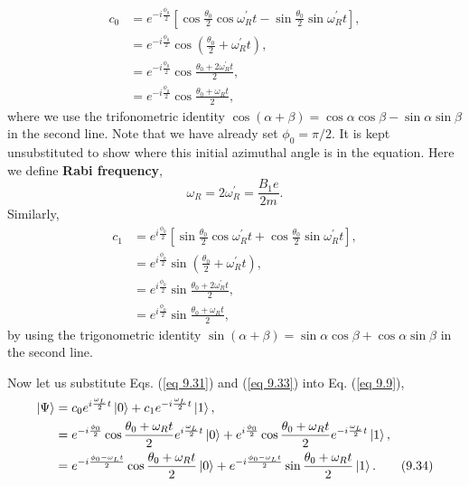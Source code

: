 \documentclass{article}
\begin{document}
\begin{align*}\label{eq 9.31}
    c_0&=e^{-i\frac{\phi_0}{2}}[\cos{\frac{\theta_0}{2}}\cos\omega_R^\prime t - \sin{\frac{\theta_0}{2}}\sin\omega_R^\prime t],\\
    &=e^{-i\frac{\phi_0}{2}}\cos(\frac{\theta_0}{2}+\omega_R^\prime t),\\
    &=e^{-i\frac{\phi_0}{2}}\cos\frac{\theta_0+2\omega_R^\prime t}{2},\\
    &=e^{-i\frac{\phi_0}{2}}\cos\frac{\theta_0+\omega_Rt}{2},\tag{9.31}
\end{align*}
where we use the trifonometric identity $\cos(\alpha+\beta)=\cos\alpha\cos\beta-\sin\alpha\sin\beta$ in the second line. Note
that we have already set $\phi_0=\pi/2$. It is kept unsubstituted to show where this initial azimuthal angle is  in the equation.
Here we define \textbf{Rabi frequency},
\begin{equation}\label{eq 9.32}
    \omega_R=2\omega_R^\prime=\frac{B_1e}{2m}.\tag{9.32}
\end{equation}
Similarly,
\begin{align*}\label{eq 9.33}
    c_1 &=e^{i\frac{\phi_0}{2}}[\sin{\frac{\theta_0}{2}}\cos\omega_R^\prime t+\cos{\frac{\theta_0}{2}}\sin{\omega_R^\prime t}],\\
    &=e^{i\frac{\phi_0}{2}}\sin ( \frac{\theta_0}{2}+\omega_R^\prime t ),\\
    &=e^{i\frac{\phi_0}{2}}\sin \frac{\theta_0+2\omega_R^\prime t}{2} ,\\
    &=e^{i\frac{\phi_0}{2}}\sin \frac{\theta_0+\omega_Rt}{2} ,\tag{9.33}
\end{align*}
by using the trigonometric identity $\sin(\alpha+\beta)=\sin\alpha\cos\beta+\cos\alpha\sin\beta$ in the second line.

Now let us substitute Eqs. (\ref{eq 9.31}) and (\ref{eq 9.33}) into Eq. (\ref{eq 9.9}),
\begin{align*}\label{eq 9.34}
    \ket{\Psi}&=c_0e^{i\frac{\omega_L}{2}t}\ket{0}+c_1e^{-i\frac{\omega_L}{2}t}\ket{1},\\
    &=e^{-i\frac{\phi_0}{2}}\cos\frac{\theta_0+\omega_R t}{2}e^{i\frac{\omega_L}{2}t}\ket{0}+
    e^{i\frac{\phi_0}{2}}\cos\frac{\theta_0+\omega_R t}{2}e^{-i\frac{\omega_L}{2}t}\ket{1},\\
    &=e^{-i\frac{\phi_0-\omega_L t}{2}}\cos\frac{\theta_0+\omega_R t}{2}\ket{0}+
    e^{-i\frac{\phi_0-\omega_L t}{2}}\sin\frac{\theta_0+\omega_R t}{2}\ket{1}. \tag{9.34}    
\end{align*}
\end{document}

